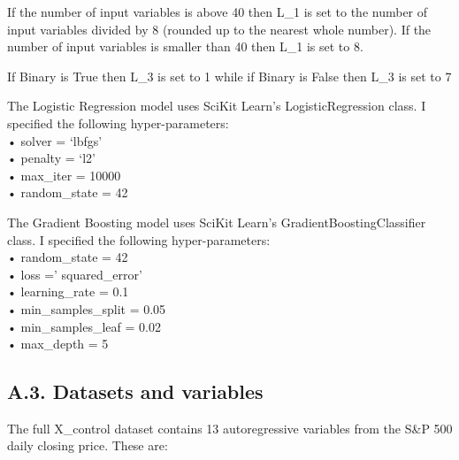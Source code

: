 \documentclass[11pt,preprint, authoryear]{elsarticle}
\numberwithin{equation}{section}
\numberwithin{figure}{section}
\numberwithin{table}{section}
\begin{document}
If the number of input variables is above 40 then L\_1 is set to the
number of input variables divided by 8 (rounded up to the nearest whole
number). If the number of input variables is smaller than 40 then L\_1
is set to 8.

If Binary is True then L\_3 is set to 1 while if Binary is False then
L\_3 is set to 7

The Logistic Regression model uses SciKit Learn's LogisticRegression
class. I specified the following hyper-parameters:\\
• solver = `lbfgs'\\
• penalty = `l2'\\
• max\_iter = 10000\\
• random\_state = 42

The Gradient Boosting model uses SciKit Learn's
GradientBoostingClassifier class. I specified the following
hyper-parameters:\\
• random\_state = 42\\
• loss =' squared\_error'\\
• learning\_rate = 0.1\\
• min\_samples\_split = 0.05\\
• min\_samples\_leaf = 0.02\\
• max\_depth = 5

\hypertarget{a.3.-datasets-and-variables}{%
\subsection*{A.3. Datasets and
variables}\label{a.3.-datasets-and-variables}}

The full X\_control dataset contains 13 autoregressive variables from
the S\&P 500 daily closing price. These are:
\end{document}
